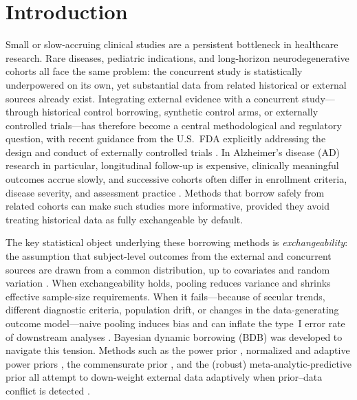 \section{Introduction}
Small or slow-accruing clinical studies are a persistent bottleneck in
healthcare research.
Rare diseases, pediatric indications, and long-horizon neurodegenerative
cohorts all face the same problem: the concurrent study is
statistically underpowered on its own, yet substantial data from related
historical or external sources already exist.
Integrating external evidence with a concurrent study---through historical
control borrowing, synthetic control arms, or externally controlled
trials---has therefore become a central methodological and regulatory
question, with recent guidance from the U.S.\ FDA explicitly addressing the
design and conduct of externally controlled trials
\citep{fda2023external,thorlund2020synthetic,edwards2024using}.
In Alzheimer's disease (AD) research in particular, longitudinal follow-up is
expensive, clinically meaningful outcomes accrue slowly, and successive
cohorts often differ in enrollment criteria, disease severity, and assessment
practice \citep{petersen2010alzheimer,weiner2017alzheimer}.
Methods that borrow safely from related cohorts can make such studies more
informative, provided they avoid treating historical data as fully
exchangeable by default.

The key statistical object underlying these borrowing methods is
\emph{exchangeability}: the assumption that subject-level outcomes from the
external and concurrent sources are drawn from a common distribution, up to
covariates and random variation \citep{pocock1976combination}.
When exchangeability holds, pooling reduces variance and shrinks effective
sample-size requirements.
When it fails---because of secular trends, different diagnostic criteria,
population drift, or changes in the data-generating outcome model---naive
pooling induces bias and can inflate the type~I error rate of downstream
analyses \citep{viele2014use,koppschneider2020power}.
Bayesian dynamic borrowing (BDB) was developed to navigate this tension.
Methods such as the power prior \citep{ibrahim2000power,ibrahim2015power},
normalized and adaptive power priors
\citep{duan2006evaluating,ye2022normalized,gravestock2017adaptive}, the
commensurate prior \citep{hobbs2011commensurate,hobbs2012commensurate}, and
the (robust) meta-analytic-predictive prior
\citep{neuenschwander2010summarizing,schmidli2014robust} all attempt to
down-weight external data adaptively when prior--data conflict is detected
\citep{evans2006checking,presanis2013conflict}.

